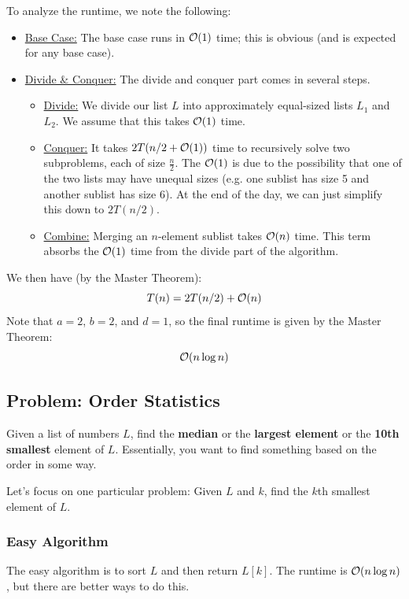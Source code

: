 \documentclass[letterpaper]{article}
\begin{document}
To analyze the runtime, we note the following:
\begin{itemize}
    \item \underline{Base Case:} The base case runs in $\mathcal{O}(1)$ time; this is obvious (and is expected for any base case).
    \item \underline{Divide \& Conquer:} The divide and conquer part comes in several steps. 
    \begin{itemize}
        \item \underline{Divide:} We divide our list $L$ into approximately equal-sized lists $L_1$ and $L_2$. We assume that this takes $\mathcal{O}(1)$ time. 
        \item \underline{Conquer:} It takes $2T(n / 2 + \mathcal{O}(1))$ time to recursively solve two subproblems, each of size $\frac{n}{2}$. The $\mathcal{O}(1)$ is due to the possibility that one of the two lists may have unequal sizes (e.g. one sublist has size 5 and another sublist has size 6). At the end of the day, we can just simplify this down to $2T(n / 2)$. 
        \item \underline{Combine:} Merging an $n$-element sublist takes $\mathcal{O}(n)$ time. This term absorbs the $\mathcal{O}(1)$ time from the divide part of the algorithm.  
    \end{itemize}
\end{itemize}
We then have (by the Master Theorem):
\[T(n) = 2T(n / 2) + \mathcal{O}(n)\]
Note that $a = 2$, $b = 2$, and $d = 1$, so the final runtime is given by the Master Theorem:
\[\mathcal{O}(n\log n)\]

\subsection{Problem: Order Statistics}
Given a list of numbers $L$, find the \textbf{median} or the \textbf{largest element} or the \textbf{10th smallest} element of $L$. Essentially, you want to find something based on the order in some way.

\bigskip 

Let's focus on one particular problem: Given $L$ and $k$, find the $k$th smallest element of $L$. 

\subsubsection{Easy Algorithm}
The easy algorithm is to sort $L$ and then return $L[k]$. The runtime is $\mathcal{O}(n \log n)$, but there are better ways to do this. 
\end{document}
